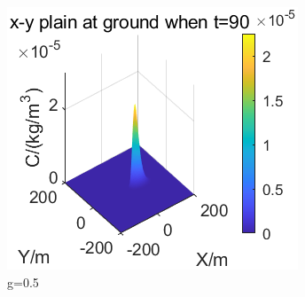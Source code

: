 \documentclass{article}
\begin{document}
\begin{figure}[htbp]
		\begin{minipage}{0.33\textwidth}
			\includegraphics[width=\textwidth]{pics/g=0.5,t=90.png}
		\end{minipage}
		\caption{g=0.5}
		\label{fig24}
	\end{figure}
\end{document}

